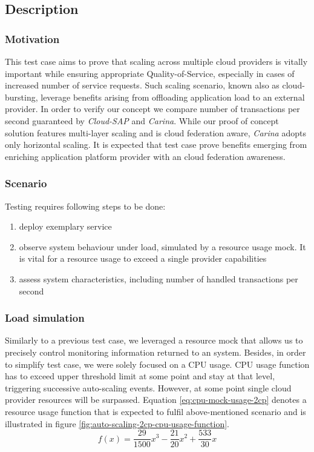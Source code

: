 \subsection*{Description}

\subsubsection{Motivation} This test case aims to prove that scaling across multiple cloud providers is vitally important while ensuring appropriate Quality-of-Service, especially in cases of increased number of service requests. Such scaling scenario, known also as cloud-bursting, leverage benefits arising from offloading application load to an external provider. In order to verify our concept we compare number of transactions per second guaranteed by \emph{Cloud-SAP} and \emph{Carina}. While our proof of concept solution features multi-layer scaling and is cloud federation aware, \emph{Carina} adopts only horizontal scaling. It is expected that test case prove benefits emerging from enriching application platform provider with an cloud federation awareness.
 
\subsubsection{Scenario}
Testing requires following steps to be done:
\begin{enumerate}
\item deploy exemplary service
\item observe system behaviour under load, simulated by a resource usage mock. It is vital for a resource usage to exceed a single provider capabilities
\item assess system characteristics, including number of handled transactions per second
\end{enumerate}

\subsubsection*{Load simulation}
Similarly to a previous test case, we leveraged a resource mock that allows us to precisely control monitoring information returned to an system. Besides, in order to simplify test case, we were solely focused on a CPU usage. CPU usage function has to exceed upper threshold limit at some point and stay at that level, triggering successive auto-scaling events. However, at some point single cloud provider resources will be surpassed. Equation \eqref{eq:cpu-mock-usage-2cp} denotes a resource usage function that is expected to fulfil above-mentioned scenario and is illustrated in figure \ref{fig:auto-scaling-2cp-cpu-usage-function}.
\begin{equation}
 f(x) = \frac{29}{1500}x^3-\frac{21}{20}x^2+\frac{533}{30}x
 \label{eq:cpu-mock-usage-2cp}
\end{equation}

